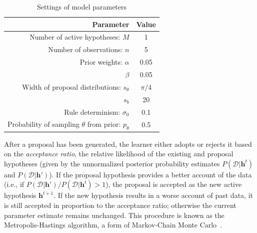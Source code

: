\documentclass[3p,twocolumn,authoryear,10pt]{elsarticle}
\begin{document}

\begin{table}[t]
\caption{Settings of model parameters}

\begin{tabular}{r|c}
\textbf{Parameter} & \textbf{Value} \\
\hline
Number of active hypotheses: $M$ & 1 \\
\hline
Number of observations: $n$ & 5  \\[1.1ex]
\hline
Prior weights: $\alpha$ & 0.05 \\ 
$\beta$ & 0.05  \\[1.1ex]
\hline
Width of proposal distributions: $s_{\theta}$ & $\pi/4$ \\
$s_b$ & 20 \\
\hline
Rule determinism: $\sigma_0$ & 0.1 \\
\hline
Probability of sampling $\theta$ from prior: $p_\theta$ & 0.5 \\
\end{tabular}
\label{par.fig}
\end{table} 

After a proposal has been generated, the learner either adopts or rejects it based on the \textit{acceptance ratio}, the relative likelihood of the existing and proposal hypotheses (given by the unnormalized posterior probability estimates $P(\mathcal{D}|\textbf{h}^t)$ and $P(\mathcal{D}|\textbf{h}')$). If the proposal hypothesis provides a better account of the data (i.e., if $P(\mathcal{D}|\textbf{h}')/P(\mathcal{D}|\textbf{h}^t) > 1$), the proposal is accepted as the new active hypothesis $\textbf{h}^{t+1}$. If the new hypothesis results in a worse account of past data, it is still accepted in proportion to the acceptance ratio; otherwise the current parameter estimate remains unchanged. This procedure is known as the Metropolis-Hastings algorithm, a form of Markov-Chain Monte Carlo~\citep{Metropolis:1949ri}.
\end{document}
